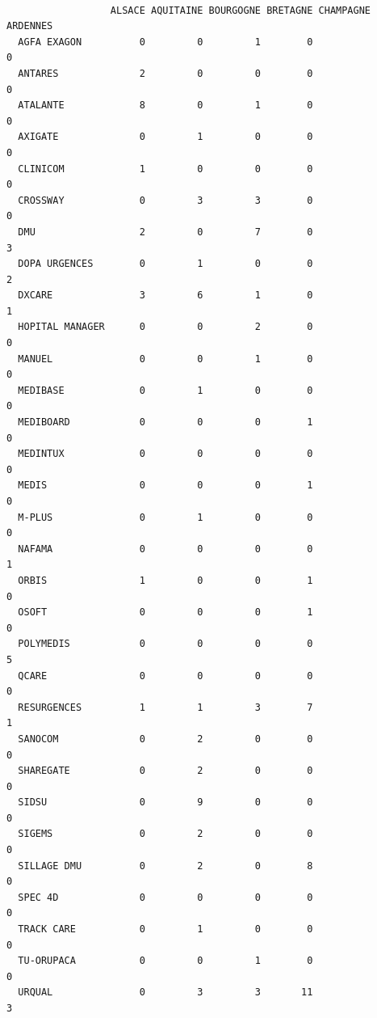 \documentclass[]{article}
\begin{document}
\begin{verbatim}
                 
                  ALSACE AQUITAINE BOURGOGNE BRETAGNE CHAMPAGNE ARDENNES
  AGFA EXAGON          0         0         1        0                  0
  ANTARES              2         0         0        0                  0
  ATALANTE             8         0         1        0                  0
  AXIGATE              0         1         0        0                  0
  CLINICOM             1         0         0        0                  0
  CROSSWAY             0         3         3        0                  0
  DMU                  2         0         7        0                  3
  DOPA URGENCES        0         1         0        0                  2
  DXCARE               3         6         1        0                  1
  HOPITAL MANAGER      0         0         2        0                  0
  MANUEL               0         0         1        0                  0
  MEDIBASE             0         1         0        0                  0
  MEDIBOARD            0         0         0        1                  0
  MEDINTUX             0         0         0        0                  0
  MEDIS                0         0         0        1                  0
  M-PLUS               0         1         0        0                  0
  NAFAMA               0         0         0        0                  1
  ORBIS                1         0         0        1                  0
  OSOFT                0         0         0        1                  0
  POLYMEDIS            0         0         0        0                  5
  QCARE                0         0         0        0                  0
  RESURGENCES          1         1         3        7                  1
  SANOCOM              0         2         0        0                  0
  SHAREGATE            0         2         0        0                  0
  SIDSU                0         9         0        0                  0
  SIGEMS               0         2         0        0                  0
  SILLAGE DMU          0         2         0        8                  0
  SPEC 4D              0         0         0        0                  0
  TRACK CARE           0         1         0        0                  0
  TU-ORUPACA           0         0         1        0                  0
  URQUAL               0         3         3       11                  3
                 

\end{verbatim}
\end{document}
